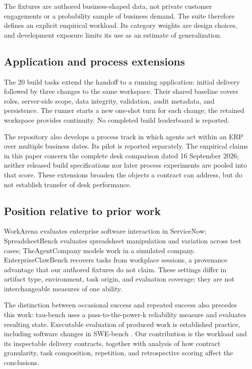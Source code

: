 The fixtures are authored business-shaped data, not private customer engagements or a probability sample of business demand. The suite therefore defines an explicit empirical workload. Its category weights are design choices, and development exposure limits its use as an estimate of generalization.

\subsection{Application and process extensions}\label{application-and-process-extensions}

The 20 build tasks extend the handoff to a running application: initial delivery followed by three changes to the same workspace. Their shared baseline covers roles, server-side scope, data integrity, validation, audit metadata, and persistence. The runner starts a new one-shot turn for each change; the retained workspace provides continuity. No completed build leaderboard is reported.

The repository also develops a process track in which agents act within an ERP over multiple business dates. Its pilot is reported separately. The empirical claims in this paper concern the complete desk comparison dated 16 September 2026; neither released build specifications nor later process experiments are pooled into that score. These extensions broaden the objects a contract can address, but do not establish transfer of desk performance.

\subsection{Position relative to prior work}\label{position-relative-to-prior-work}

WorkArena \citep{workarena} evaluates enterprise software interaction in ServiceNow; SpreadsheetBench \citep{spreadsheetbench} evaluates spreadsheet manipulation and variation across test cases; TheAgentCompany \citep{agentcompany} models work in a simulated company. EnterpriseClawBench \citep{enterpriseclawbench} recovers tasks from workplace sessions, a provenance advantage that our authored fixtures do not claim. These settings differ in artifact type, environment, task origin, and evaluation coverage; they are not interchangeable measures of one ability.

The distinction between occasional success and repeated success also precedes this work: tau-bench \citep{taubench} uses a pass-to-the-power-k reliability measure and evaluates resulting state. Executable evaluation of produced work is established practice, including software changes in SWE-bench \citep{swebench}. Our contribution is the workload and its inspectable delivery contracts, together with analysis of how contract granularity, task composition, repetition, and retrospective scoring affect the conclusions.

